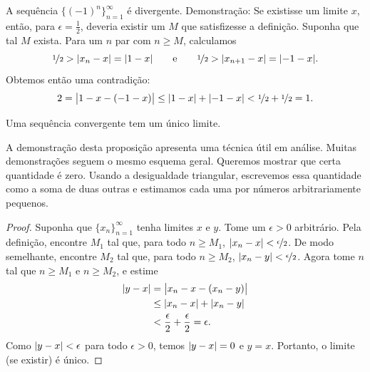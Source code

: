 \begin{example}
A sequência $\bigl\{ {(-1)}^n \bigr\}_{n=1}^\infty$ é divergente.
Demonstração: Se existisse um limite $x$, então, para $\epsilon = \frac{1}{2}$,
deveria existir um $M$ que satisfizesse a definição. Suponha que tal $M$
exista. Para um $n$ par com $n \geq M$, calculamos
\begin{equation*}
\nicefrac{1}{2} > \lvert {x_n - x} \rvert  = \lvert {1 - x} \rvert
\qquad \text{e} \qquad
\nicefrac{1}{2} > \lvert {x_{n+1} - x} \rvert  = \lvert {-1 - x} \rvert .
\end{equation*}
Obtemos então uma contradição:
\begin{equation*}
2 = \bigl\lvert {1 - x - (-1 -x)} \bigr\rvert \leq
\lvert {1 - x} \rvert + \lvert {-1 -x} \rvert < \nicefrac{1}{2} + \nicefrac{1}{2} = 1 .
\end{equation*}
\end{example}

\begin{prop} \label{prop:limisunique}
Uma sequência convergente tem um único limite.
\end{prop}

A demonstração desta proposição apresenta uma técnica útil em análise.
Muitas demonstrações seguem o mesmo esquema geral. Queremos mostrar que certa
quantidade é zero. Usando a desigualdade triangular, escrevemos essa
quantidade como a soma de duas outras e estimamos cada uma por números
arbitrariamente pequenos.

\begin{proof}
Suponha que $\{ x_n \}_{n=1}^\infty$ tenha limites $x$ e $y$.
Tome um $\epsilon > 0$ arbitrário.
Pela definição, encontre $M_1$ tal que, para todo $n \geq M_1$,
$\lvert {x_n-x} \rvert < \nicefrac{\epsilon}{2}$. De modo semelhante, encontre
$M_2$ tal que, para todo $n \geq M_2$,
$\lvert {x_n-y} \rvert < \nicefrac{\epsilon}{2}$.
Agora tome $n$ tal que $n \geq M_1$ e $n \geq M_2$, e estime
\begin{equation*}
\begin{split}
\lvert {y-x} \rvert
& =
\bigl\lvert {x_n-x - (x_n -y)} \bigr\rvert \\
& \leq
\lvert {x_n-x} \rvert + \lvert {x_n -y} \rvert \\
& <
\frac{\epsilon}{2} + \frac{\epsilon}{2} = \epsilon .
\end{split}
\end{equation*}
Como $\lvert {y-x} \rvert < \epsilon$ para todo $\epsilon > 0$, temos
$\lvert {y-x} \rvert = 0$ e $y=x$. Portanto, o limite (se existir) é único.
\end{proof}

